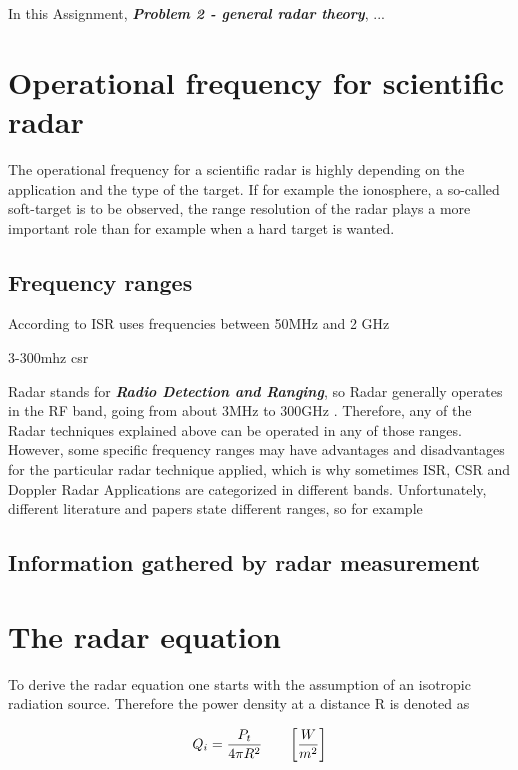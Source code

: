 

In this Assignment, \textit{\textbf{Problem 2 - general radar theory}}, ...


\section{Operational frequency for scientific radar}
The operational frequency for a scientific radar is highly depending on the application and the type of the target. If for example the ionosphere, a so-called soft-target is to be observed, the range resolution of the radar plays a more important role than for example when a hard target is wanted. 


\subsection{Frequency ranges}
According to  ISR uses frequencies between 50MHz and 2 GHz

3-300mhz csr

Radar stands for \textit{\textbf{Radio Detection and Ranging}}, so Radar generally operates in the RF band, going from about 3MHz to 300GHz \citep{richards2010principles}. Therefore, any of the Radar techniques explained above can be operated in any of those ranges. However, some specific frequency ranges may have advantages and disadvantages for the particular radar technique applied, which is why sometimes ISR, CSR and Doppler Radar Applications are categorized in different bands. Unfortunately, different literature and papers state different ranges, so for example


\subsection{Information gathered by radar measurement}



\section{The radar equation}
To derive the radar equation one starts with the assumption of an isotropic radiation source. Therefore the power density at a distance R is denoted as


\begin{equation}
\label{eq:iso}
	\centering
	Q_{i} = \frac{P_t}{4 \pi R^2} \qquad \bigg[\frac{W}{m^2} \bigg]
\end{equation}

